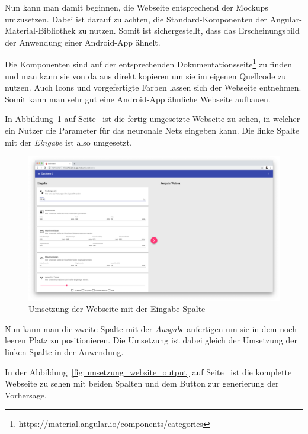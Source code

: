 Nun kann man damit beginnen, die Webseite entsprechend der Mockups umzusetzen. Dabei ist darauf zu achten, die
Standard-Komponenten der Angular-Material-Bibliothek zu nutzen. Somit ist sichergestellt, dass das Erscheinungsbild der
Anwendung einer Android-App ähnelt.

Die Komponenten sind auf der entsprechenden
Dokumentationsseite\footnote{https://material.angular.io/components/categories} zu finden und man kann sie von da aus
direkt kopieren um sie im eigenen Quellcode zu nutzen. Auch Icons und vorgefertigte Farben lassen sich der Webseite
entnehmen. Somit kann man sehr gut eine Android-App ähnliche Webseite aufbauen.

In Abbildung~\ref{fig:umsetzung_website_input} auf Seite~\pageref{fig:umsetzung_website_input} ist die fertig
umgesetzte Webseite zu sehen, in welcher ein Nutzer die Parameter für das neuronale Netz eingeben kann. Die linke Spalte
mit der \textit{Eingabe} ist also umgesetzt.

\begin{figure}[h]
    \centering
    \includegraphics[width=\textwidth]{images/kapitel_4/website_input.png}
    \caption{Umsetzung der Webseite mit der Eingabe-Spalte}
    \label{fig:umsetzung_website_input}
\end{figure}

Nun kann man die zweite Spalte mit der \textit{Ausgabe} anfertigen um sie in dem noch leeren Platz zu positionieren. Die
Umsetzung ist dabei gleich der Umsetzung der linken Spalte in der Anwendung.

In der Abbildung~\ref{fig:umsetzung_website_output} auf Seite~\pageref{fig:umsetzung_website_output} ist die komplette
Webseite zu sehen mit beiden Spalten und dem Button zur generierung der Vorhersage.

